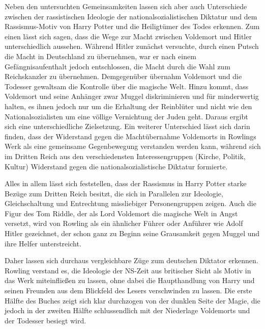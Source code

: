 Neben den untersuchten Gemeinsamkeiten lassen sich aber auch  Unterschiede zwischen der rassistischen Ideologie der nationalsozialistischen Diktatur und dem Rassismus-Motiv von \glqq Harry Potter und die Heiligtümer des Todes\grqq{} erkennen.
Zum einen lässt sich sagen, dass die Wege zur Macht zwischen Voldemort und Hitler unterschiedlich aussehen.
Während Hitler zunächst versuchte, durch einen Putsch die Macht in Deutschland zu übernehmen, war er nach einem Gefängnisaufenthalt jedoch entschlossen, die Macht durch die Wahl zum Reichskanzler zu übernehmen\cite[S.\,12-27]{MW121}. 
Demgegenüber übernahm Voldemort und die Todesser gewaltsam die Kontrolle über die magische Welt\cite[S.\,13]{JKR10}. 
Hinzu kommt, dass Voldemort und seine Anhänger zwar Muggel diskriminieren und für minderwertig halten, es ihnen jedoch nur um die Erhaltung der Reinblüter und nicht wie den Nationalsozialisten um eine völlige Vernichtung der Juden geht\cite[S.\,43]{MW123}.
Daraus ergibt sich eine unterschiedliche Zielsetzung.
Ein weiterer Unterschied lässt sich darin finden, dass der Widerstand gegen die Machtübernahme Voldemorts in Rowlings Werk als eine gemeinsame Gegenbewegung verstanden werden kann, während sich im Dritten Reich aus den verschiedensten Interessengruppen (Kirche, Politik, Kultur) Widerstand gegen die nationalsozialistische Diktatur formierte.

Alles in allem lässt sich feststellen, dass der Rassismus in \glqq Harry Potter\grqq{} starke Bezüge zum Dritten Reich besitzt, die sich in Parallelen zur Ideologie, Gleichschaltung und Entrechtung missliebiger Personengruppen zeigen.
Auch die Figur des Tom Riddle, der als Lord Voldemort die magische Welt in Angst versetzt, wird von Rowling als ein ähnlicher \glqq Führer\grqq{} oder Anführer wie Adolf Hitler gezeichnet, der schon ganz zu Beginn seine Grausamkeit gegen Muggel und ihre Helfer unterstreicht.

Daher lassen sich durchaus vergleichbare Züge zum deutschen Diktator erkennen.
Rowling verstand es, die Ideologie der NS-Zeit aus britischer Sicht als Motiv in das Werk miteinfließen zu lassen, ohne dabei die Haupthandlung von Harry und seinen Freunden aus dem Blickfeld des Lesers verschwinden zu lassen. 
Die erste Hälfte des Buches zeigt sich klar durchzogen von der dunklen Seite der Magie, die jedoch in der zweiten Hälfte schlussendlich mit der Niederlage Voldemorts und der Todesser besiegt wird.
